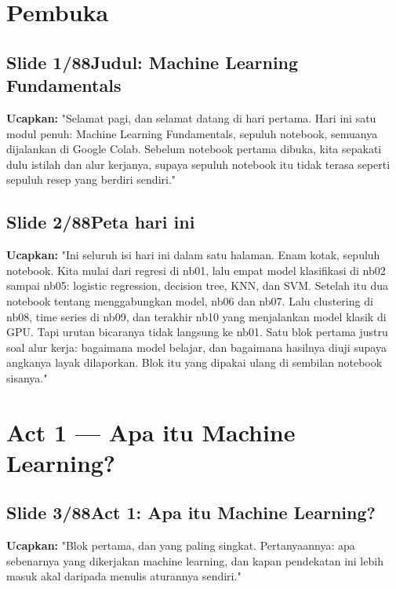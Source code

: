 \documentclass[11pt]{article}
\renewcommand{\framebox}[1]{\colorbox{acc!15}{\textcolor{acc}{\textbf{#1}}}}
\begin{document}
\newpage
\tableofcontents
\newpage

\section{Pembuka}

\subsection*{\framebox{Slide 1/88}\quad Judul: Machine Learning Fundamentals}
\textbf{Ucapkan:} "Selamat pagi, dan selamat datang di hari pertama. Hari ini satu modul penuh: Machine Learning Fundamentals, sepuluh notebook, semuanya dijalankan di Google Colab. Sebelum notebook pertama dibuka, kita sepakati dulu istilah dan alur kerjanya, supaya sepuluh notebook itu tidak terasa seperti sepuluh resep yang berdiri sendiri."\\[2pt]

\subsection*{\framebox{Slide 2/88}\quad Peta hari ini}
\textbf{Ucapkan:} "Ini seluruh isi hari ini dalam satu halaman. Enam kotak, sepuluh notebook. Kita mulai dari regresi di nb01, lalu empat model klasifikasi di nb02 sampai nb05: logistic regression, decision tree, KNN, dan SVM. Setelah itu dua notebook tentang menggabungkan model, nb06 dan nb07. Lalu clustering di nb08, time series di nb09, dan terakhir nb10 yang menjalankan model klasik di GPU. Tapi urutan bicaranya tidak langsung ke nb01. Satu blok pertama justru soal alur kerja: bagaimana model belajar, dan bagaimana hasilnya diuji supaya angkanya layak dilaporkan. Blok itu yang dipakai ulang di sembilan notebook sisanya."\\[2pt]

\section{Act 1 — Apa itu Machine Learning?}

\subsection*{\framebox{Slide 3/88}\quad Act 1: Apa itu Machine Learning?}
\textbf{Ucapkan:} "Blok pertama, dan yang paling singkat. Pertanyaannya: apa sebenarnya yang dikerjakan machine learning, dan kapan pendekatan ini lebih masuk akal daripada menulis aturannya sendiri."\\[2pt]
\end{document}
